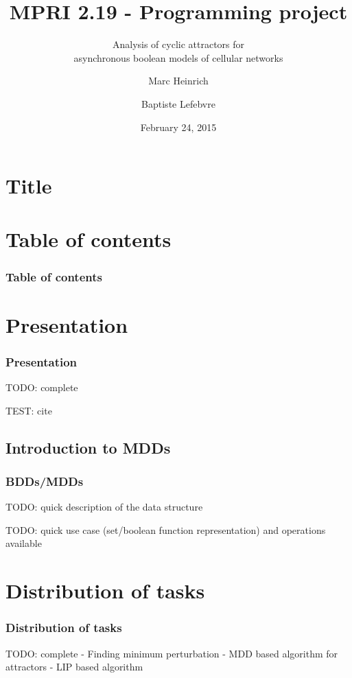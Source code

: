\documentclass{beamer}
\title{MPRI 2.19 - Programming project}
\subtitle{Analysis of cyclic attractors for \\ asynchronous boolean models of cellular networks}
\author{Marc Heinrich \and Baptiste Lefebvre}
\institute{École Normale Supérieure, Computer Science Department}
\date{February 24, 2015}
\begin{document}
\section*{Title}

\begin{frame}
  \titlepage
\end{frame}


\section*{Table of contents}

\begin{frame}
  \frametitle{Table of contents}
  \tableofcontents
\end{frame} 



\section{Presentation}

\begin{frame}
  \frametitle{Presentation}    
  TODO: complete
  
  TEST: cite \cite{Bonzanni}
\end{frame}

\subsection{Introduction to MDDs}
\begin{frame}
\frametitle{BDDs/MDDs}
	TODO: quick description of the data structure
\end{frame}

\begin{frame}
TODO: quick use case (set/boolean function representation) and operations available
\end{frame}


\section{Distribution of tasks}

\begin{frame}
  \frametitle{Distribution of tasks}
  TODO: complete
- Finding minimum perturbation
- MDD based algorithm for attractors
- LIP based algorithm  
  
\end{frame}
\end{document}
